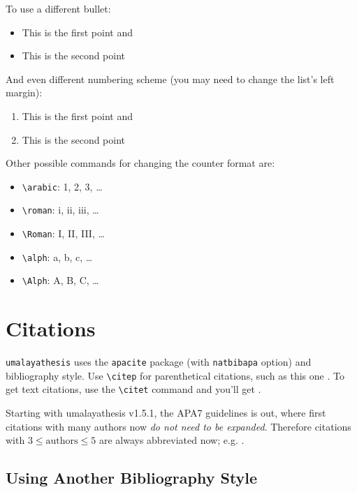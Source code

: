 To use a different bullet:

\begin{itemize}[label=$\star$]
  \item This is the first point and
  \item This is the second point
\end{itemize}

And even different numbering scheme (you may need to change the list's left margin):

\begin{enumerate}[label=(\roman*),leftmargin=3em]
  \item This is the first point and
  \item This is the second point
\end{enumerate}

Other possible commands for changing the counter format are:

\begin{itemize}
\item \verb|\arabic|: 1, 2, 3, \ldots
\item \verb|\roman|: i, ii, iii, \ldots
\item \verb|\Roman|: I, II, III, \ldots
\item \verb|\alph|: a, b, c, \ldots
\item \verb|\Alph|: A, B, C, \ldots
\end{itemize}

\section{Citations}

\texttt{umalayathesis} uses the \texttt{apacite} package (with \texttt{natbibapa} option) and bibliography style. Use \verb|\citep| for parenthetical citations, such as this one \citep{audibert:2004}. To get text citations, use the \verb|\citet| command and you'll get \citet{audibert:2004}.

Starting with umalayathesis v1.5.1, the APA7 guidelines is out, where first citations with many authors now \emph{do not need to be expanded}. Therefore citations with $3 \leq \text{authors} \leq 5$ are always abbreviated now; e.g. \cite{azarova:etal:2002}.

\subsection{Using Another Bibliography Style}
\label{sec:custombib}

